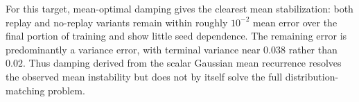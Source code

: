 \documentclass[10pt]{article}
\begin{document}
For this target, mean-optimal damping gives the clearest mean stabilization:
both replay and no-replay variants remain within roughly $10^{-2}$ mean
error over the final portion of training and show little seed dependence.
The remaining error is predominantly a variance error, with terminal
variance near $0.038$ rather than $0.02$.  Thus damping derived from the
scalar Gaussian mean recurrence resolves the observed mean instability but
does not by itself solve the full distribution-matching problem.
\end{document}
